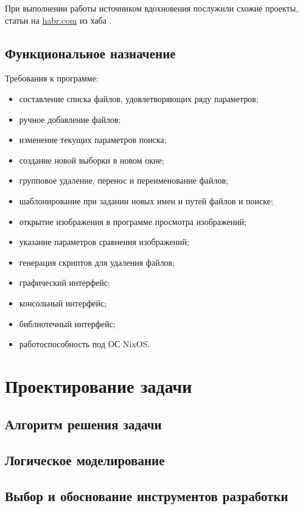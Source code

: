 \documentclass[variant=courcework]{bsuir}
\begin{document}
При выполнении работы источником вдохновения послужили схожие проекты, статьи на
\href{https://habr.com/}{habr.com} из хаба .

\section{Функциональное назначение}

Требования к программе:

\begin{itemize}
    \item составление списка файлов, удовлетворяющих ряду параметров;
    \item ручное добавление файлов;
    \item изменение текущих параметров поиска;
    \item создание новой выборки в новом окне;
    \item групповое удаление, перенос и переименование файлов;
    \item шаблонирование при задании новых имен и путей файлов и поиске;
    \item открытие изображения в программе просмотра изображений;
    \item указание параметров сравнения изображений;
    \item генерация скриптов для удаления файлов;
    \item графический интерфейс;
    \item консольный интерфейс;
    \item библиотечный интерфейс;
    \item работоспособность под ОС NixOS.
\end{itemize}

\chapter{Проектирование задачи}

\section{Алгоритм решения задачи}



\section{Логическое моделирование}

\section{Выбор и обоснование инструментов разработки}
\end{document}
